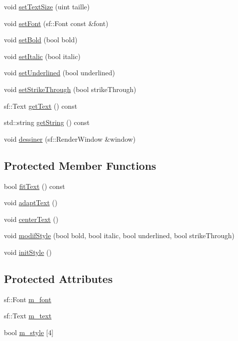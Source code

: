 \begin{DoxyCompactItemize}
\item 
void \hyperlink{classBoutonTexte_a6f61089ff0ac3781d7e8ee6b71abbd01}{set\+Text\+Size} (uint taille)
\item 
void \hyperlink{classBoutonTexte_aa1be3dfb869765c3fb3af4d44d0736ed}{set\+Font} (sf\+::\+Font const \&font)
\item 
void \hyperlink{classBoutonTexte_afcaf8ea6421d4ded5cee30739553c17e}{set\+Bold} (bool bold)
\item 
void \hyperlink{classBoutonTexte_aa448c0163aca20db26a3cd92d266ab83}{set\+Italic} (bool italic)
\item 
void \hyperlink{classBoutonTexte_a7fdc380e2cd49d2b8e6c57cb456cb8ae}{set\+Underlined} (bool underlined)
\item 
void \hyperlink{classBoutonTexte_ab81c1ce75bbb54265dad98c86c67ea74}{set\+Strike\+Through} (bool strike\+Through)
\item 
sf\+::\+Text \hyperlink{classBoutonTexte_a426af0b13653bc55cb4652ce4d1fe985}{get\+Text} () const
\item 
std\+::string \hyperlink{classBoutonTexte_a621710e92704902ac505a89a9d1ef67b}{get\+String} () const
\item 
void \hyperlink{classBoutonTexte_a144df8e92d58470bc15b87dd13b6c3ef}{dessiner} (sf\+::\+Render\+Window \&window)
\end{DoxyCompactItemize}
\subsection*{Protected Member Functions}
\begin{DoxyCompactItemize}
\item 
bool \hyperlink{classBoutonTexte_a8f5bb56ad2161d1d204ee73af9d68eb8}{fit\+Text} () const
\item 
void \hyperlink{classBoutonTexte_a54ca85310f69ccc120df980495390466}{adapt\+Text} ()
\item 
void \hyperlink{classBoutonTexte_a3b9eef3a26d8925c558582a7216c8e3c}{center\+Text} ()
\item 
void \hyperlink{classBoutonTexte_a418fb00a38049d07199fc619fe4e31d3}{modif\+Style} (bool bold, bool italic, bool underlined, bool strike\+Through)
\item 
void \hyperlink{classBoutonTexte_ab1ffba678bd0b224149859d2925cb49b}{init\+Style} ()
\end{DoxyCompactItemize}
\subsection*{Protected Attributes}
\begin{DoxyCompactItemize}
\item 
sf\+::\+Font \hyperlink{classBoutonTexte_a92d3ce11bc4a1719d86458bad2f05849}{m\+\_\+font}
\item 
sf\+::\+Text \hyperlink{classBoutonTexte_a96c677df7e44162cc9206e84fe2692cf}{m\+\_\+text}
\item 
bool \hyperlink{classBoutonTexte_a9103da6bfb25d8871e3fdbda942ec3d1}{m\+\_\+style} \mbox{[}4\mbox{]}
\end{DoxyCompactItemize}


